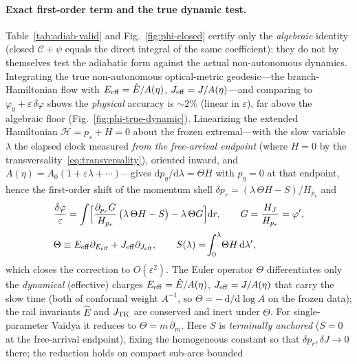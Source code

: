 \documentclass[12pt]{iopart}
\newcommand{\Ehat}{\hat E}
\newcommand{\dd}{\mathrm{d}}
\begin{document}
\paragraph{Exact first-order term and the true dynamic test.} Table~\ref{tab:adiab-valid}
and Fig.~\ref{fig:phi-closed} certify only the \emph{algebraic} identity (closed
$\mathcal{C}+\psi$ equals the direct integral of the same coefficient); they do not by
themselves test the adiabatic form against the actual non-autonomous dynamics. Integrating
the true non-autonomous optical-metric geodesic---the branch-Hamiltonian flow with
$E_{\rm eff}=\Ehat/A(\eta)$, $J_{\rm eff}=J/A(\eta)$---and comparing to
$\varphi_0+\varepsilon\,\delta\varphi$ shows the \emph{physical} accuracy is $\sim2\%$
(linear in $\varepsilon$), far above the algebraic floor
(Fig.~\ref{fig:phi-true-dynamic}). Linearizing the extended Hamiltonian
$\mathcal H=p_s+H=0$ about the frozen extremal---with the slow variable
$\lambda$ the elapsed clock measured \emph{from the free-arrival endpoint} (where
$H=0$ by the transversality~\eqref{eq:transversality}), oriented inward, and
$A(\eta)=A_0(1+\varepsilon\lambda+\cdots)$---gives $\dd p_\eta/\dd\lambda=\Theta H$
with $p_\eta=0$ at that endpoint, hence the first-order shift of the momentum shell
$\delta p_r=(\lambda\,\Theta H-S)/H_{p_r}$ and
\begin{equation}
    \begin{aligned}
    &\frac{\delta\varphi}{\varepsilon}=\int\!\Big[\frac{\partial_{p_r}G}{H_{p_r}}\,
    \big(\lambda\,\Theta H-S\big)-\lambda\,\Theta G\Big]\dd r,\qquad
    G=\frac{H_J}{H_{p_r}}=\varphi',\\[2pt]
    &\Theta\equiv E_{\rm eff}\partial_{E_{\rm eff}}+J_{\rm eff}\partial_{J_{\rm eff}},
    \qquad S(\lambda)=\!\int_0^{\lambda}\!\Theta H\,\dd\lambda',
    \end{aligned}
    \label{eq:adiab-exact}
\end{equation}
which closes the correction to $O(\varepsilon^2)$. The Euler operator $\Theta$
differentiates only the \emph{dynamical} (effective) charges
$E_{\rm eff}=\Ehat/A(\eta)$, $J_{\rm eff}=J/A(\eta)$ that carry the slow time
(both of conformal weight $A^{-1}$, so $\Theta=-\,\dd/\dd\log A$ on the frozen data);
the rail invariants $\Ehat$ and $J_{\rm TK}$ are conserved and inert under $\Theta$.
For single-parameter Vaidya it reduces to $\Theta=m\,\partial_m$. Here $S$ is \emph{terminally
anchored} ($S=0$ at the free-arrival endpoint), fixing the homogeneous constant so
that $\delta p_r,\delta J\to0$ there; the reduction holds on compact sub-arcs bounded
\end{document}
